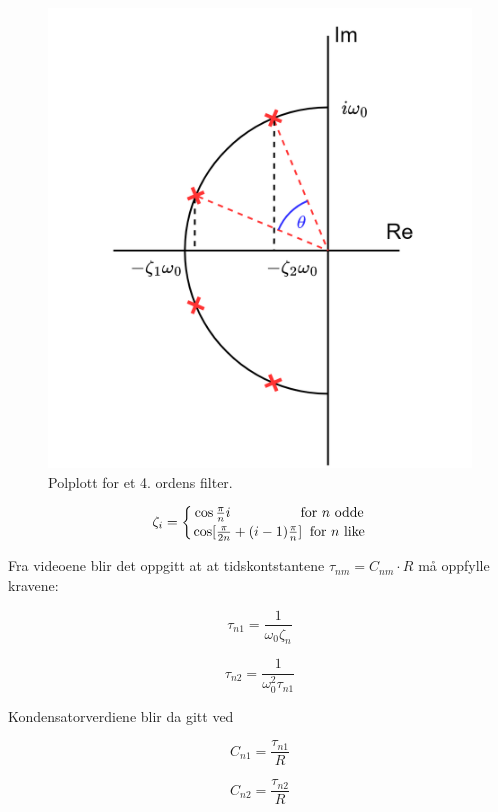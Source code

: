 \begin{figure}[H]
	\centering
	\includegraphics[scale=0.2]{./Images/02Concept/polplott.png}
	\caption{Polplott for et 4. ordens filter.\cite{pham_2022_selvlaget}}
	\label{fig:polezeroplot}
\end{figure}

\begin{equation}
	\zeta_i= \biggl\{ {{\cos\frac{\pi}{n}i \;\;\;\;\;\;\;\;\;\;\;\;\;\;\;\;\; \text{ for } n \text{ odde}} \atop {\cos [\frac{\pi}{2n}+(i-1)\frac{\pi}{n}] \: \text{ for } n \text{ like}}}
	\label{eq:dempningsfaktor}
\end{equation}

Fra videoene \cite{lundheim_2022_et} \cite{larslundheim_2022_peter2} blir det oppgitt at at tidskontstantene $\tau_{nm}=C_{nm} \cdot R$ må oppfylle kravene:

\noindent\begin{minipage}{.5\linewidth}
	\begin{equation}
		\tau_{n1}=\frac{1}{\omega_0 \zeta_n} 
	\end{equation}
	\end{minipage}%
	\begin{minipage}{.5\linewidth}
	\begin{equation}
		\tau_{n2}=\frac{1}{\omega_0^2 \tau_{n1}}
	\end{equation}
	\label{eq:tau}
	\end{minipage}

Kondensatorverdiene blir da gitt ved

\noindent\begin{minipage}{.5\linewidth}
	\begin{equation}
		C_{n1}= \frac{\tau_{n1}}{R} 
	\end{equation}
	\end{minipage}%
	\begin{minipage}{.5\linewidth}
	\begin{equation}
		C_{n2}= \frac{\tau_{n2}}{R} 
	\end{equation}
	\label{eq:capacitor}
	\end{minipage}